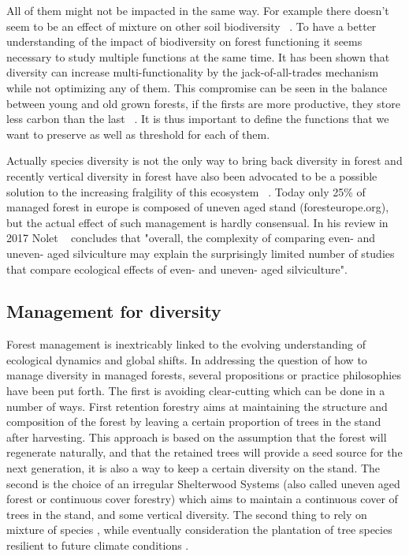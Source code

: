 \documentclass{article}
\begin{document}
All of them might not be impacted in the same way. For example there doesn't seem to be an effect of mixture on other soil biodiversity ~\autocite{korboulewskyHowTreeDiversity2016}.
To have a better understanding of the impact of biodiversity on forest functioning it seems necessary to study multiple functions at the same time. It has been shown that diversity can increase multi-functionality by the jack-of-all-trades mechanism ~\autocite{vanderplasJackofalltradesEffectsDrive2016} while not optimizing any of them. This compromise can be seen in the balance between young and old grown forests, if the firsts are more productive, they store less carbon than the last ~\autocite{caspersenSuccessionalDiversityForest2001}. It is thus important to define the functions that we want to preserve as well as threshold for each of them.

Actually species diversity is not the only way to bring back diversity in forest and recently vertical diversity in forest have also been advocated to be a possible solution to the increasing fralgility of this ecosystem ~\autocite{guldinRoleUnevenAgedSilviculture1996}. Today only 25\% of managed forest in europe is composed of uneven aged stand (foresteurope.org), but the actual effect of such management is hardly consensual. In his review in 2017 Nolet ~\autocite{noletComparingEffectsEven2018} concludes that "overall, the complexity	of comparing even- and uneven- aged silviculture may explain the surprisingly limited number of studies that compare ecological effects of even- and uneven- aged silviculture".

\subsection{Management for diversity}

Forest management is inextricably linked to the evolving understanding of ecological dynamics and global shifts. In addressing the question of how to manage diversity in managed forests, several propositions or practice philosophies have been put forth. The first is avoiding clear-cutting which can be done in a number of ways. First retention forestry \autocite{gustafssonRetentionForestryMaintain2012,rosenvaldWhatWhenWhere2008} aims at maintaining the structure and composition of the forest by leaving a certain proportion of trees in the stand after harvesting. This approach is based on the assumption that the forest will regenerate naturally, and that the retained trees will provide a seed source for the next generation, it is also a way to keep a certain diversity on the stand. The second is the choice of an irregular Shelterwood Systems (also called uneven aged forest or continuous cover forestry) \autocite{sinhaOptimalManagementNaturally2017,schallImpactEvenagedUnevenaged2018,nylandEvenUnevenagedChallenges2003,noletComparingEffectsEven2018,dudumanForestManagementPlanning2011} which aims to maintain a continuous cover of trees in the stand, and some vertical diversity. The second thing to rely on mixture of species \autocite{morinTreeSpeciesRichness2011,jourdanManagingMixedStands2021}, while eventually consideration the plantation of tree species resilient to future climate conditions \autocite{websterPromotingMaintainingDiversity2018}.
\end{document}
